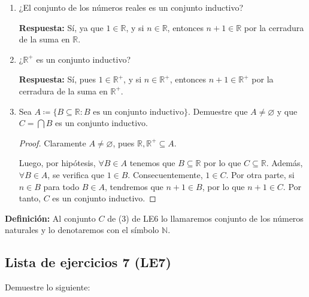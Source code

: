 \documentclass[11pt]{article}
\newcommand{\N}{\mathbb{N}}
\newcommand{\R}{\mathbb{R}}
\let\emptyset\varnothing
\begin{document}
\begin{enumerate}[label=\arabic*)]
    \item ¿El conjunto de los números reales es un conjunto inductivo?
    
    \textbf{Respuesta:} Sí, ya que $1 \in \R$, y si $n\in \R$, entonces $n+1 \in \R$ por la cerradura de la suma en $\R$.


    \item ¿$\R^+$ es un conjunto inductivo?
    
    \textbf{Respuesta:} Sí, pues $1\in \R^+$, y si $n\in \R^+$, entonces $n+1 \in \R^+$ por la cerradura de la suma en $\R^+$.

    \item Sea $A\coloneqq \{B \subseteq \R: B \text{ es un conjunto inductivo}\}$. Demuestre que $A\neq \emptyset$ y que $C=\bigcap B$ es un conjunto inductivo.
    
    \vspace{-1em}\begin{proof} 
    Claramente $A \neq \emptyset$, pues $\R, \R^+ \subseteq A$.
    
    Luego, por hipótesis, $\forall B \in A$ tenemos que $B\subseteq \R $ por lo que $C\subseteq \R$. Además, $\forall B\in A$, se verifica que $1\in B$. Consecuentemente, $1\in C$. Por otra parte, si $n\in B$ para todo $B\in A$, tendremos que $n+1\in B$, por lo que $n+1 \in C$. Por tanto, $C$ es un conjunto inductivo.
    \end{proof} \vspace{-1em}
\end{enumerate}

\textbf{Definición:} Al conjunto $C$ de (3) de LE6 lo llamaremos conjunto de los números naturales y lo denotaremos con el símbolo $\N$.

\subsection*{Lista de ejercicios 7 (LE7)}

Demuestre lo siguiente:
\end{document}
